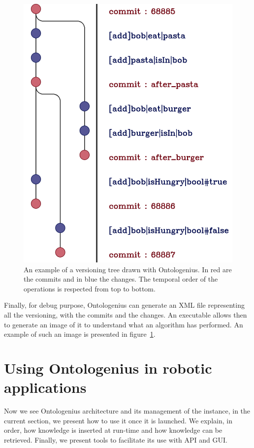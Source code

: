 \begin{figure}[ht!]
\centering
\includegraphics[scale=0.22]{figures/chapter2/commit.png}
\caption{\label{fig:chap2_commit} An example of a versioning tree drawn with Ontologenius. In red are the commits and in blue the changes. The temporal order of the operations is respected from top to bottom. }
\end{figure}

Finally, for debug purpose, Ontologenius can generate an XML file representing all the versioning, with the commits and the changes. An executable allows then to generate an image of it to understand what an algorithm has performed. An example of such an image is presented in figure~\ref{fig:chap2_commit}.

\section{Using Ontologenius in robotic applications}

Now we see Ontologenius architecture and its management of the instance, in the current section, we present how to use it once it is launched. We explain, in order, how knowledge is inserted at run-time and how knowledge can be retrieved. Finally, we present tools to facilitate its use with API and GUI.


